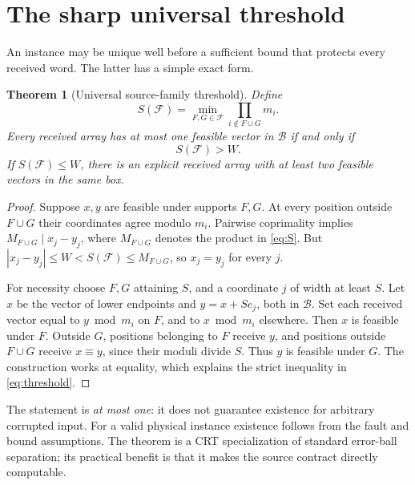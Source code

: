 \documentclass[11pt]{article}
\newtheorem{theorem}{Theorem}
\theoremstyle{definition}\newtheorem{definition}[theorem]{Definition}
\newcommand{\F}{\mathcal F}
\newcommand{\B}{\mathcal B}
\begin{document}
\section{The sharp universal threshold}
An instance may be unique well before a sufficient bound that protects every received word. The latter has a simple exact form.
\begin{theorem}[Universal source-family threshold]\label{thm:threshold}
Define
\begin{equation}\label{eq:S}
 S(\F)=\min_{F,G\in\F}\prod_{i\notin F\cup G}m_i.
\end{equation}
Every received array has at most one feasible vector in $\B$ if and only if
\begin{equation}\label{eq:threshold} S(\F)>W.\end{equation}
If $S(\F)\le W$, there is an explicit received array with at least two feasible vectors in the same box.
\end{theorem}
\begin{proof}
Suppose $x,y$ are feasible under supports $F,G$. At every position outside $F\cup G$ their coordinates agree modulo $m_i$. Pairwise coprimality implies $M_{F\cup G}\mid x_j-y_j$, where $M_{F\cup G}$ denotes the product in \eqref{eq:S}. But $|x_j-y_j|\le W<S(\F)\le M_{F\cup G}$, so $x_j=y_j$ for every $j$.

For necessity choose $F,G$ attaining $S$, and a coordinate $j$ of width at least $S$. Let $x$ be the vector of lower endpoints and $y=x+Se_j$, both in $\B$. Set each received vector equal to $y\bmod m_i$ on $F$, and to $x\bmod m_i$ elsewhere. Then $x$ is feasible under $F$. Outside $G$, positions belonging to $F$ receive $y$, and positions outside $F\cup G$ receive $x\equiv y$, since their moduli divide $S$. Thus $y$ is feasible under $G$. The construction works at equality, which explains the strict inequality in \eqref{eq:threshold}.
\end{proof}

The statement is \emph{at most one}: it does not guarantee existence for arbitrary corrupted input. For a valid physical instance existence follows from the fault and bound assumptions. The theorem is a CRT specialization of standard error-ball separation; its practical benefit is that it makes the source contract directly computable.
\end{document}
